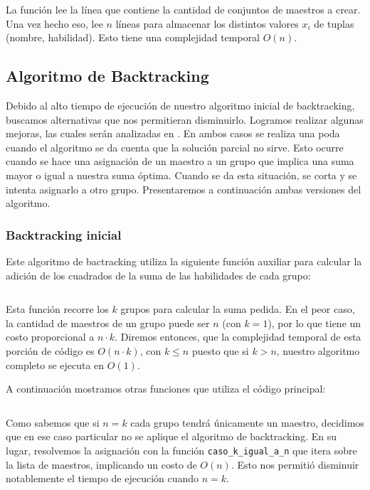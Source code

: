\documentclass{article}
\begin{document}
La función lee la línea que contiene la cantidad de conjuntos de maestros a crear. Una vez hecho eso, lee $n$ líneas para almacenar los distintos valores $x_i$ de tuplas (nombre, habilidad). Esto tiene una complejidad temporal $O(n)$.

\subsection{Algoritmo de Backtracking}

Debido al alto tiempo de ejecución de nuestro algoritmo inicial de backtracking, buscamos alternativas que nos permitieran disminuirlo. Logramos realizar algunas mejoras, las cuales serán analizadas en . En ambos casos se realiza una poda cuando el algoritmo se da cuenta que la solución parcial no sirve. Esto ocurre cuando se hace una asignación de un maestro a un grupo que implica una suma mayor o igual a nuestra suma óptima. Cuando se da esta situación, se corta y se intenta asignarlo a otro grupo. Presentaremos a continuación ambas versiones del algoritmo. 

\subsubsection{Backtracking inicial}
Este algoritmo de bactracking utiliza la siguiente función auxiliar para calcular la adición de los cuadrados de la suma de las habilidades de cada grupo:
\inputminted[linenos, firstline=47, lastline=54]{python}{codigo/backtracking.py}

Esta función recorre los $k$ grupos para calcular la suma pedida. En el peor caso, la cantidad de maestros de un grupo puede ser $n$ (con $k = 1$), por lo que tiene un costo proporcional a $n \cdot k$. Diremos entonces, que la complejidad temporal de esta porción de código es $O(n \cdot k)$, con $k \leq n$ puesto que si $k > n$, nuestro algoritmo completo se ejecuta en $O(1)$.  

A continuación mostramos otras funciones que utiliza el código principal:

\inputminted[linenos, firstline=56, lastline=73]{python}{codigo/backtracking.py}

Como sabemos que si $n = k$ cada grupo tendrá únicamente un maestro, decidimos que en ese caso particular no se aplique el algoritmo de backtracking. En su lugar, resolvemos la asignación con la función \texttt{caso\_k\_igual\_a\_n} que itera sobre la lista de maestros, implicando un costo de $O(n)$. Esto nos permitió disminuir notablemente el tiempo de ejecución cuando $n = k$. 
\end{document}

